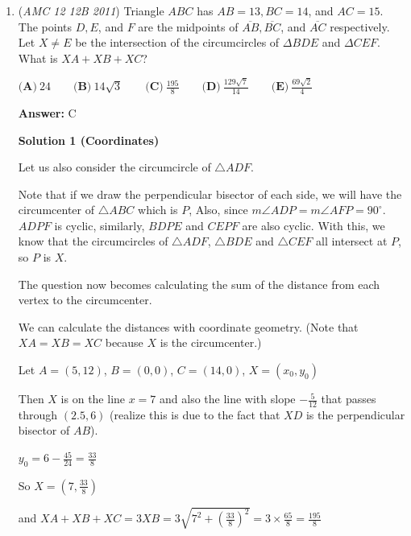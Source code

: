 \begin{enumerate}
 We will start with the first answer choice. Notice how it is impossible for a line with slope $\frac{51}{101}$ to pass through a lattice point when $0 < x \leq 100$. 

 However, if the slope is $\frac{50}{99}$, then the line will pass through the point $(99, 50)$. This sets the upper bound for $a$ as $\boxed{\textbf{(B)}}$.

 


	\item (\textit{AMC 12 12B 2011}) Triangle $ABC$ has $AB = 13, BC = 14$, and $AC = 15$. The points $D, E$, and $F$ are the midpoints of $\overline{AB}, \overline{BC}$, and $\overline{AC}$ respectively. Let $X \not= E$ be the intersection of the circumcircles of $\Delta BDE$ and $\Delta CEF$. What is $XA + XB + XC$?


 $\textbf{(A)}\ 24 \qquad \textbf{(B)}\ 14\sqrt{3} \qquad \textbf{(C)}\ \frac{195}{8} \qquad \textbf{(D)}\ \frac{129\sqrt{7}}{14} \qquad \textbf{(E)}\ \frac{69\sqrt{2}}{4}$

 \textbf{Answer: }C



\textbf{Solution 1 (Coordinates)}

Let us also consider the circumcircle of $\triangle ADF$.

 Note that if we draw the perpendicular bisector of each side, we will have the circumcenter of $\triangle ABC$ which is $P$, Also, since $m\angle ADP = m\angle AFP = 90^\circ$. $ADPF$ is cyclic, similarly, $BDPE$ and $CEPF$ are also cyclic. With this, we know that the circumcircles of $\triangle ADF$, $\triangle BDE$ and $\triangle CEF$ all intersect at $P$, so $P$ is $X$.

 The question now becomes calculating the sum of the distance from each vertex to the circumcenter. 

 We can calculate the distances with coordinate geometry. (Note that $XA = XB = XC$ because $X$ is the circumcenter.)

 Let $A = (5,12)$, $B = (0,0)$, $C = (14, 0)$, $X= (x_0, y_0)$

 Then $X$ is on the line $x = 7$ and also the line with slope $-\frac{5}{12}$ that passes through $(2.5, 6)$ (realize this is due to the fact that $XD$ is the perpendicular bisector of $AB$). 

 $y_0 = 6-\frac{45}{24} = \frac{33}{8}$

 So $X = (7, \frac{33}{8})$

 and $XA +XB+XC = 3XB = 3\sqrt{7^2 + \left(\frac{33}{8}\right)^2} = 3\times\frac{65}{8}=\boxed{\frac{195}{8}}$


\end{enumerate}
